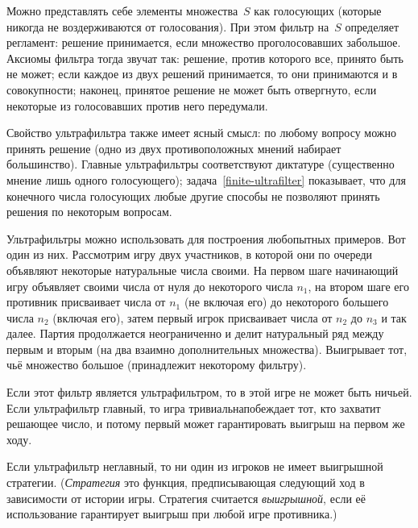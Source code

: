 Можно представлять себе элементы множества~$S$ как голосующих
(которые никогда не воздерживаются от голосования). При этом
фильтр на~$S$ определяет регламент: решение принимается, если
множество проголосовавших  за\т большое. Аксиомы
фильтра тогда звучат так: решение, против которого все, принято
быть не может; если каждое из двух решений принимается, то они
принимаются и в совокупности; наконец, принятое решение не может
быть отвергнуто, если некоторые из голосовавших против него
передумали.

Свойство ультрафильтра также имеет ясный смысл: по любому
вопросу можно принять решение (одно из двух противоположных
мнений набирает большинство). Главные ультрафильтры
соответствуют диктатуре (существенно мнение лишь одного
голосующего); задача~\ref{finite-ultrafilter} показывает, что
для конечного числа голосующих любые другие способы не позволяют
принять решения по некоторым вопросам.

\smallskip

Ультрафильтры можно использовать для построения любопытных
примеров. Вот один из них. Рассмотрим игру двух участников, в
которой они по очереди объявляют некоторые натуральные числа 
своими. На первом шаге начинающий игру объявляет своими числа
от нуля до некоторого числа $n_1$, на втором шаге его противник
присваивает числа от $n_1$ (не включая его) до некоторого
большего числа $n_2$ (включая его), затем первый игрок
присваивает числа от $n_2$ до $n_3$ и так далее. Партия
продолжается неограниченно и делит натуральный ряд между первым
и вторым (на два взаимно дополнительных множества). Выигрывает
тот, чьё множество большое (принадлежит некоторому фильтру).

Если этот фильтр является ультрафильтром, то в этой игре не
может быть ничьей. Если ультрафильтр главный, то игра
тривиальна\т побеждает тот, кто захватит решающее число, и
потому первый может гарантировать выигрыш на первом же ходу.

\begin{theorem}
Если ультрафильтр неглавный, то ни один из игроков не имеет
выигрышной стратегии. (\emph{Стратегия}%
%
\т это функция,
предписывающая следующий ход в зависимости от истории игры.
Стратегия считается \emph{выигрышной},%
%
если её использование
гарантирует выигрыш при любой игре противника.)
\end{theorem}


